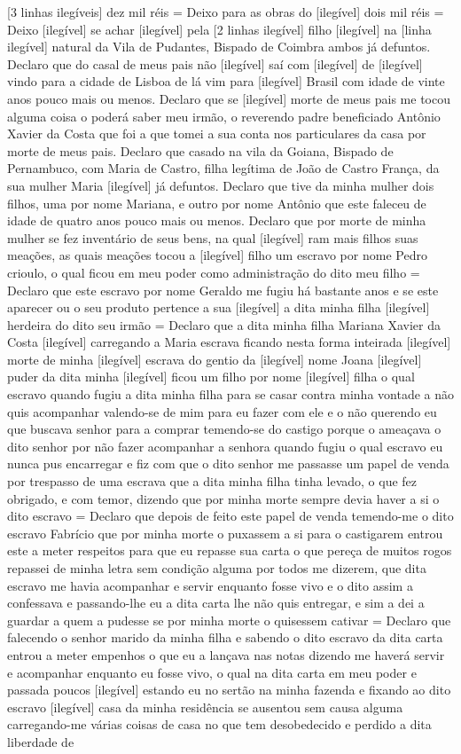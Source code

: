 \begin{refsection}
    \noindent{}[3 linhas ilegíveis] dez mil réis = Deixo para as obras do [ilegível] dois mil réis = Deixo [ilegível] se achar [ilegível] pela [2 linhas ilegível] filho [ilegível] na [linha ilegível] natural da Vila de Pudantes, Bispado de Coimbra ambos já defuntos. Declaro que do casal de meus pais não [ilegível] saí com [ilegível] de [ilegível] vindo para a cidade de Lisboa de lá vim para [ilegível] Brasil com idade de vinte anos pouco mais ou menos. Declaro que se [ilegível] morte de meus pais me tocou alguma coisa o poderá saber meu irmão, o reverendo padre beneficiado Antônio Xavier da Costa que foi a que tomei a sua conta nos particulares da casa por morte de meus pais. Declaro que casado na vila da Goiana, Bispado de Pernambuco, com Maria de Castro, filha legítima de João de Castro França, da sua mulher Maria [ilegível] já defuntos. Declaro que tive da minha mulher dois filhos, uma por nome Mariana, e outro por nome Antônio que este faleceu de idade de quatro anos pouco mais ou menos. Declaro que por morte de minha mulher se fez inventário de seus bens, na qual [ilegível] ram mais filhos suas meações, as quais meações tocou a [ilegível] filho um escravo por nome Pedro crioulo, o qual ficou em meu poder como administração do dito meu filho = Declaro que este escravo por nome Geraldo me fugiu há bastante anos e se este aparecer ou o seu produto pertence a sua [ilegível]  a dita minha filha [ilegível] herdeira do dito seu irmão = Declaro que a dita minha filha Mariana Xavier da Costa [ilegível] carregando a Maria escrava ficando nesta forma inteirada [ilegível] morte de minha [ilegível] escrava do gentio da [ilegível] nome Joana [ilegível] puder da dita minha [ilegível] ficou um filho por nome [ilegível] filha o qual escravo quando fugiu a dita minha filha para se casar contra minha vontade a não quis acompanhar valendo-se de mim para eu fazer com ele e o não querendo eu que buscava senhor para a comprar temendo-se do castigo porque o ameaçava o dito senhor por não fazer acompanhar a senhora quando fugiu o qual escravo eu nunca pus encarregar e fiz com que o dito senhor me passasse um papel de venda por trespasso de uma escrava que a dita minha filha tinha levado, o que fez obrigado, e com temor, dizendo que por minha morte sempre devia haver a si o dito escravo = Declaro que depois de feito este papel de venda temendo-me o dito escravo Fabrício que por minha morte o puxassem a si para o castigarem entrou este a meter respeitos para que eu repasse sua carta o que pereça de muitos rogos repassei de minha letra sem condição alguma por todos me dizerem, que dita escravo me havia acompanhar e servir enquanto fosse vivo e o dito assim a confessava e passando-lhe eu a dita carta lhe não quis entregar, e sim a dei a guardar a quem a pudesse se por minha morte o quisessem cativar = Declaro que falecendo o senhor marido da minha filha e sabendo o dito escravo da dita carta entrou a meter empenhos o que eu a lançava nas notas dizendo me haverá servir e acompanhar enquanto eu fosse vivo, o qual na dita carta em meu poder e passada poucos [ilegível] estando eu no sertão na minha fazenda e fixando ao dito escravo [ilegível] casa da minha residência se ausentou sem causa alguma carregando-me várias coisas de casa no que tem desobedecido e perdido a dita liberdade de 
\end{refsection}
